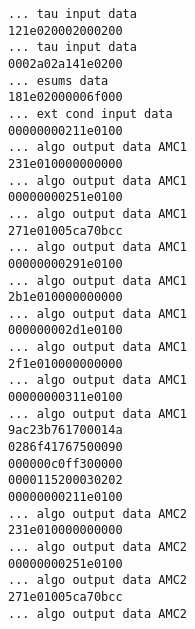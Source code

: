 \texttt{... tau input data}\\
\texttt{121e020002000200}\\
\texttt{... tau input data}\\
\texttt{0002a02a141e0200}\\
\texttt{... esums data }\\
\texttt{181e02000006f000}\\
\texttt{... ext cond input data}\\
\texttt{00000000211e0100}\\
\texttt{... algo output data AMC1}\\
\texttt{231e010000000000}\\
\texttt{... algo output data AMC1}\\
\texttt{00000000251e0100}\\
\texttt{... algo output data AMC1}\\
\texttt{271e01005ca70bcc}\\
\texttt{... algo output data AMC1}\\
\texttt{00000000291e0100}\\
\texttt{... algo output data AMC1}\\
\texttt{2b1e010000000000}\\
\texttt{... algo output data AMC1}\\
\texttt{000000002d1e0100}\\
\texttt{... algo output data AMC1}\\
\texttt{2f1e010000000000}\\
\texttt{... algo output data AMC1}\\
\texttt{00000000311e0100}\\
\texttt{... algo output data AMC1}\\
\texttt{9ac23b761700014a}\\
\texttt{0286f41767500090}\\
\texttt{000000c0ff300000}\\
\texttt{0000115200030202}\\
\texttt{00000000211e0100}\\
\texttt{... algo output data AMC2}\\
\texttt{231e010000000000}\\
\texttt{... algo output data AMC2}\\
\texttt{00000000251e0100}\\
\texttt{... algo output data AMC2}\\
\texttt{271e01005ca70bcc}\\
\texttt{... algo output data AMC2}\\
